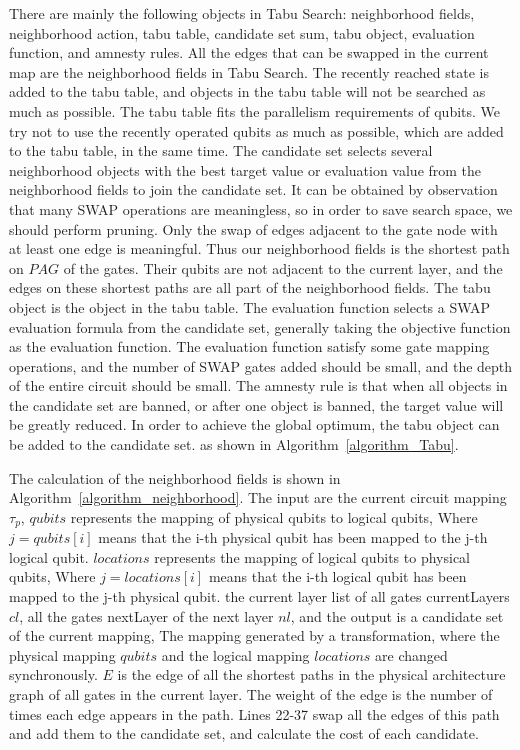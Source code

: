 \documentclass[runningheads]{llncs}
\begin{document}
There are mainly the following objects in Tabu Search: neighborhood fields, neighborhood action, 
tabu table, candidate set sum, tabu object, evaluation function, and amnesty rules.
All the edges that can be swapped in the current map are the neighborhood fields in Tabu Search.
The recently reached state is added to the tabu table, 
and objects in the tabu table will not be searched as much as possible. 
The tabu table fits the parallelism requirements of qubits.
We try not to use the recently operated qubits as much as possible, 
which are added to the tabu table, in the same time.
The candidate set selects several neighborhood objects with the best target value or 
evaluation value from the neighborhood fields
to join the candidate set. It can be obtained by observation that many SWAP operations are meaningless, 
so in order to save search space, we should perform pruning.
Only the swap of edges adjacent to the gate node with at least one edge is meaningful.
Thus our neighborhood fields is the shortest path on $PAG$ of the gates. 
Their qubits are not adjacent to the current layer, 
and the edges on these shortest paths are all part of the neighborhood fields.
The tabu object is the object in the tabu table.
The evaluation function selects a SWAP evaluation formula from the candidate set, 
generally taking the objective function as the evaluation function.
The evaluation function  satisfy some gate mapping operations, 
and the number of SWAP gates added should be small, and the depth of the entire circuit should be small.
The amnesty rule is that when all objects in the candidate set are banned, 
or after one object is banned, the target value will be greatly reduced. 
In order to achieve the global optimum, the tabu object can be added to the candidate set. 
as shown in Algorithm~\ref{algorithm_Tabu}.

The calculation of the neighborhood fields is shown in 
Algorithm~\ref{algorithm_neighborhood}. 
The input are the current circuit mapping $\tau_{p}$, 
$ qubits $ represents the mapping of physical qubits to logical qubits,
Where $ j = qubits [i] $ means that the i-th physical qubit 
has been mapped to the j-th logical qubit.
$ locations $ represents the mapping of logical qubits to physical qubits,
Where $ j = locations [i] $ means that the i-th logical qubit 
has been mapped to the j-th physical qubit.
the current layer list of all gates currentLayers $cl$, 
all the gates nextLayer of the next layer $nl$, 
and the output is a candidate set of the current mapping, 
The mapping generated by a transformation, 
where the physical mapping $ qubits $   and the logical mapping $ locations $ 
are changed synchronously. 
$E$ is the edge of all the shortest paths in the physical architecture 
graph of all gates in the current layer. The weight of the edge is the number of times each edge appears 
in the path.
Lines 22-37 swap all the edges of this path and add them to the candidate set, 
and calculate the cost of each candidate.
\end{document}
